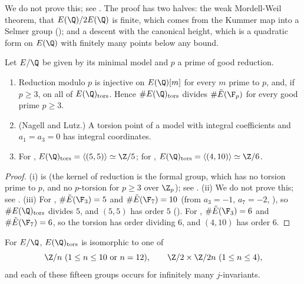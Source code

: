 \noindent We do not prove this; see \cite[Chapter VIII]{SilvermanAEC}. The proof has two halves: the weak Mordell-Weil theorem, that $E(\Q)/2E(\Q)$ is finite, which
comes from the Kummer map into a Selmer group (); and a descent with the canonical height, which is a quadratic form on $E(\Q)$ with finitely many
points below any bound.

\begin{proposition}\label{prop:ellcurves:torsred}
Let $E/\Q$ be given by its minimal model and $p$ a prime of good reduction.
\begin{enumerate}[label=(\roman*)]
\item Reduction modulo $p$ is injective on $E(\Q)[m]$ for every $m$ prime to $p$, and, if $p\ge3$, on all of $E(\Q)_{\mathrm{tors}}$. Hence $\#E(\Q)_{\mathrm{tors}}$ divides $\#\tilde E(\F_p)$ for every
good prime $p\ge3$.
\item (Nagell and Lutz.) A torsion point of a model with integral coefficients and $a_1=a_3=0$ has integral coordinates.
\item For , $E(\Q)_{\mathrm{tors}}=\langle(5,5)\rangle\simeq\Z/5$; for , $E(\Q)_{\mathrm{tors}}=\langle(4,10)\rangle\simeq\Z/6$.
\end{enumerate}
\end{proposition}

\begin{proof}
(i) is  (the kernel of reduction is the formal group, which has no torsion prime to $p$, and no $p$-torsion for $p\ge3$ over $\Z_p$); see
\cite[Sections VII.3 and VIII.7]{SilvermanAEC}. (ii) We do not prove this; see \cite[Section VIII.7]{SilvermanAEC}. (iii) For , $\#\tilde E(\F_3)=5$ and $\#\tilde E(\F_7)=10$ (from
$a_3=-1$, $a_7=-2$, ), so $\#E(\Q)_{\mathrm{tors}}$ divides $5$, and $(5,5)$ has order $5$ (). For , $\#\tilde E(\F_3)=6$ and
$\#\tilde E(\F_7)=6$, so the torsion has order dividing $6$, and $(4,10)$ has order $6$.
\end{proof}

\begin{theorem}[Mazur]\label{thm:ellcurves:mazur}
For $E/\Q$, $E(\Q)_{\mathrm{tors}}$ is isomorphic to one of
\[
\Z/n\ (1\le n\le10\text{ or }n=12),\qquad\Z/2\times\Z/2n\ (1\le n\le4),
\]
and each of these fifteen groups occurs for infinitely many $j$-invariants.
\end{theorem}


